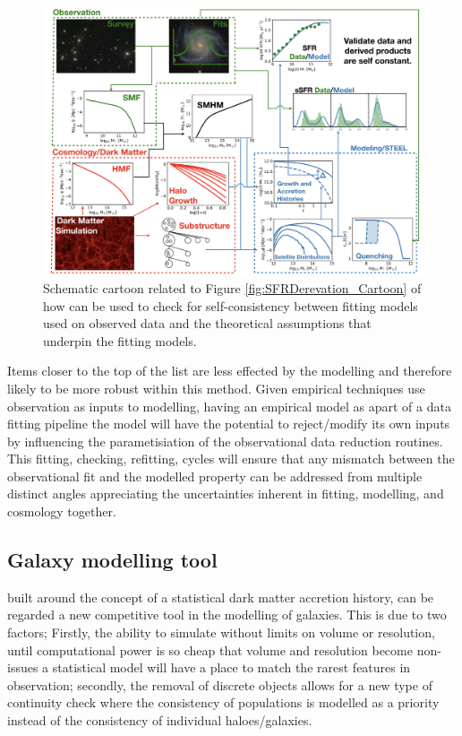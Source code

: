 \begin{figure}[t]
    \centering
    \includegraphics[width = \linewidth]{Figures/Chapter6/FullModelCartoon.png}
    \caption{Schematic cartoon related to Figure \ref{fig:SFRDerevation_Cartoon} of how \steel can be used to check for self-consistency between fitting models used on observed data and the theoretical assumptions that underpin the fitting models.}
    \label{fig:Full_Mod_Toon}
\end{figure}
Items closer to the top of the list are less effected by the modelling and therefore likely to be more robust within this method. Given empirical techniques use observation as inputs to modelling, having an empirical model as apart of a data fitting pipeline the model will have the potential to reject/modify its own inputs by influencing the parametisiation of the observational data reduction routines. This fitting, checking, refitting, cycles will ensure that any mismatch between the observational fit and the modelled property can be addressed from multiple distinct angles appreciating the uncertainties inherent in fitting, modelling, and cosmology together.

\subsection{Galaxy modelling tool}

\steel built around the concept of a statistical dark matter accretion history, can be regarded a new competitive tool in the modelling of galaxies. This is due to two factors; Firstly, the ability to simulate without limits on volume or resolution, until computational power is so cheap that volume and resolution become non-issues a statistical model will have a place to match the rarest features in observation; secondly, the removal of discrete objects allows for a new type of continuity check where the consistency of populations is modelled as a priority instead of the consistency of individual haloes/galaxies. 

